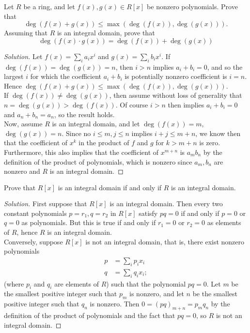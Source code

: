 \documentclass[12pt]{article}
\newenvironment{problem}[2][Problem]{\begin{trivlist}
\item[\hskip \labelsep {\bfseries #1}\hskip \labelsep {\bfseries #2.}]}{\end{trivlist}}
\newenvironment{solution}
  {\renewcommand\qedsymbol{$\blacksquare$}\begin{proof}[Solution]}
{\end{proof}}
\theoremstyle{remark}
\begin{document}
\begin{problem}{1.14}
  Let $R$ be a ring, and let $f(x),g(x)\in R[x]$ be nonzero polynomials.
  Prove that
  \begin{equation*}
    \deg(f(x)+g(x))\leq \max(\deg(f(x)), \deg(g(x))).
  \end{equation*}
  Assuming that $R$ is an integral domain, prove that
  \begin{equation*}
    \deg(f(x)\cdot g(x)) = \deg(f(x)) + \deg(g(x))
  \end{equation*}
\end{problem}
\begin{solution}
  Let $f(x)=\sum_i a_ix^i$ and $g(x)=\sum_i b_ix^i$.
  If $\deg(f(x))=\deg(g(x))=n$, then $i>n$ implies $a_i+b_i=0$, and so the largest $i$
  for which the coefficient $a_i+b_i$ is potentially nonzero coefficient is $i=n$.
  Hence $\deg(f(x)+g(x))\leq \max(\deg(f(x)), \deg(g(x)))$.\\
  \indent If $\deg(f(x))\neq\deg(g(x))$, then assume without loss of generality that\\
  $n = \deg(g(x)) > \deg(f(x))$.
  Of course $i > n$ then implies $a_i+b_i = 0$ and $a_n+b_n = a_n$, so the result holds.\\
  \indent Now, assume $R$ is an integral domain, and let $\deg(f(x)) = m$, $\deg(g(x))=n$.
  Since no $i\leq m, j\leq n$ implies $i+j\leq m+n$, we know then that the coefficient of
  $x^k$ in the product of $f$ and $g$ for $k>m+n$ is zero.
  Furthermore, this also implies that the coefficient of $x^{m+n}$ is $a_mb_n$ by the definition
  of the product of polynomials, which is nonzero since $a_m,b_n$ are nonzero and $R$ is an integral
  domain.
\end{solution}

\begin{problem}{1.15}
  Prove that $R[x]$ is an integral domain if and only if $R$ is an integral domain.
\end{problem}
\begin{solution}
  First suppose that $R[x]$ is an integral domain.
  Then every two constant polynomials $p = r_1, q=r_2$ in $R[x]$ satisfy $pq=0$ if and only if
  $p = 0$ or $q = 0$ as polynomials.
  But this is true if and only if $r_1=0$ or $r_2=0$ as elements of $R$, hence $R$ is an integral
  domain.\\
  \indent Conversely, suppose $R[x]$ is not an integral domain, that is, there exist nonzero polynomials
    \begin{align*}
      p &= \sum_ip_ix_i\\
      q &= \sum_iq_ix_i;
    \end{align*}
  (where $p_i$ and $q_i$ are elements of $R$) such that the polynomial $pq=0$.
  Let $m$ be the smallest positive integer such that $p_m$ is nonzero, and let $n$ be the smallest 
  positive integer such that $q_n$ is nonzero.
  Then $0 = (pq)_{m+n} = p_mq_n$ by the definition of the product of polynomials
  and the fact that $pq=0$, so $R$ is not an integral domain.
\end{solution}<++>
\end{document}
